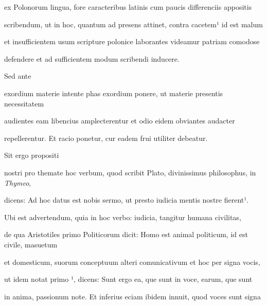 ex Polonorum lingua, fore caracteribus latinis cum paucis differenciis appositis

scribendum, ut in hoc, quantum ad presens attinet, contra cacetem¹ id est malum

et insufficientem usum scripture polonice laborantes videamur patriam comodose

\splitlines{}
defendere et ad sufficientem modum scribendi inducere.

\indentK Sed ante

\fulllines{}

exordium materie intente phas exordium ponere, ut materie presentis necessitatem

audientes eam libencius amplecterentur et odio eidem obviantes audacter

\splitlines{}
repellerentur. Et racio ponetur, cur eadem frui utiliter debeatur.

\indentK Sit ergo propositi



\fulllines{}

nostri pro themate hoc verbum, quod scribit Plato, divinissimus philosophus, in \textit{Thymeo},


dicens: Ad hoc datus est nobis sermo, ut presto iudicia mentis nostre fierent¹.

Ubi est advertendum, quia in hoc verbo: iudicia, tangitur humana civilitas,

de qua Aristotiles primo Politicorum dicit: Homo est animal politicum, id est civile, masuetum

et domesticum, suorum conceptuum alteri comunicativum et hoc per signa vocis,


ut idem notat primo  ¹, dicens: Sunt ergo ea, que sunt in voce, earum, que sunt

in anima, passionum note. Et inferius eciam ibidem innuit, quod voces sunt signa

